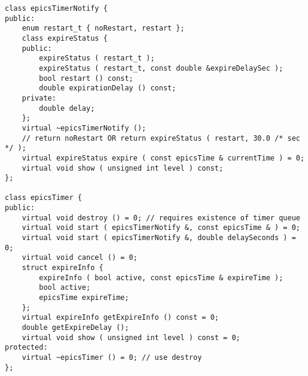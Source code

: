 \begin{verbatim}class epicsTimerNotify {
public:
    enum restart_t { noRestart, restart };
    class expireStatus {
    public:
        expireStatus ( restart_t );
        expireStatus ( restart_t, const double &expireDelaySec );
        bool restart () const;
        double expirationDelay () const;
    private:
        double delay;
    };
    virtual ~epicsTimerNotify ();
    // return noRestart OR return expireStatus ( restart, 30.0 /* sec */ );
    virtual expireStatus expire ( const epicsTime & currentTime ) = 0;
    virtual void show ( unsigned int level ) const;
};

class epicsTimer {
public:
    virtual void destroy () = 0; // requires existence of timer queue
    virtual void start ( epicsTimerNotify &, const epicsTime & ) = 0;
    virtual void start ( epicsTimerNotify &, double delaySeconds ) = 0;
    virtual void cancel () = 0;
    struct expireInfo {
        expireInfo ( bool active, const epicsTime & expireTime );
        bool active;
        epicsTime expireTime;
    };
    virtual expireInfo getExpireInfo () const = 0;
    double getExpireDelay ();
    virtual void show ( unsigned int level ) const = 0;
protected:
    virtual ~epicsTimer () = 0; // use destroy
};
\end{verbatim}
